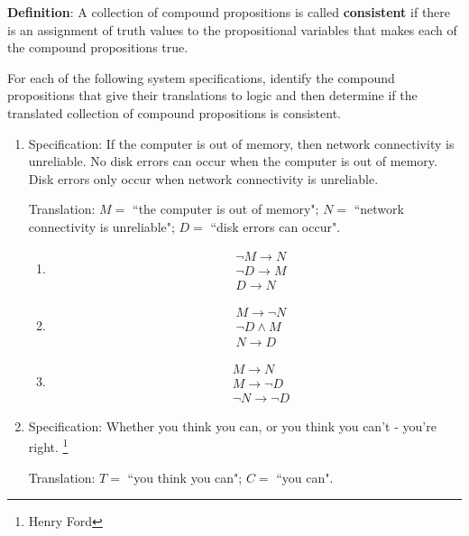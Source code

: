 
{\bf Definition}: A collection of  compound  propositions
is called {\bf consistent} if  there
is  an assignment  of  truth values
to  the  propositional variables that makes
each of the compound propositions  true.

For each of  the following  system specifications, 
identify the compound propositions  that give their
translations to logic  and then determine if the
translated collection  of compound
propositions is consistent.

\begin{enumerate}
    \item Specification: If the computer is out of memory, then network connectivity is unreliable. No disk errors can occur when the computer is out of memory. Disk
    errors only occur when network connectivity is unreliable.
    
    Translation: $M =$ ``the computer is  out of memory"; $N = $ ``network connectivity
    is unreliable"; $D = $  ``disk errors  can occur".
    
    \begin{enumerate}
        \item \begin{align*} &\neg M \to  N  \\ & \neg D \to M \\ & D \to N \end{align*}
        \item \begin{align*} &M \to  \neg N  \\ & \neg D \wedge M \\ & N \to D \end{align*}
        \item \begin{align*} &M \to  N  \\ &  M \to \neg D \\ & \neg  N \to \neg D \end{align*}
    \end{enumerate}
    
    \newpage
    \item Specification: Whether you think you can, or you think you can't - you're right.
\footnote{Henry Ford}
    
    Translation: $T =$ ``you  think  you  can"; $C = $  ``you  can".
    

\end{enumerate}
